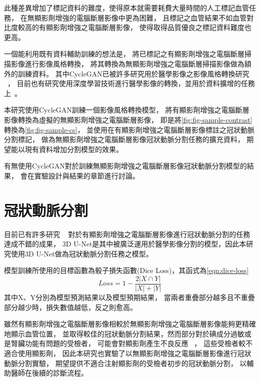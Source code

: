 \documentclass[class=NCU_thesis, crop=false]{standalone}
\begin{document}
此種差異增加了標記資料的難度，使得原本就需要耗費大量時間的人工標記血管任務，
在無顯影劑增強的電腦斷層影像中更為困難，
且標記之血管結果不如血管對比度較高的有顯影劑增強之電腦斷層影像，
使得取得品質優良之標記資料難度也更高。

一個能利用既有資料輔助訓練的想法是，
將已標記之有顯影劑增強之電腦斷層掃描影像進行影像風格轉換，
將其轉換為無顯影劑增強之電腦斷層掃描影像做為額外的訓練資料。
其中CycleGAN已被許多研究用於醫學影像之影像風格轉換研究
~\cite{jiangTumorAwareAdversarialDomain2018, welanderGenerativeAdversarialNetworks2018, songNoncontrastCTLiver2020}，
目前也有研究使用深度學習技術進行醫學影像的轉換，並用於資料擴增的任務上~\cite{songNoncontrastCTLiver2020}。

本研究使用CycleGAN訓練一個影像風格轉換模型，
將有顯影劑增強之電腦斷層影像轉換為虛擬的無顯影劑增強之電腦斷層影像，
即是將\cref{fig:fig-sample-contrast}轉換為\cref{fig:fig-sample-cs}，
並使用在有顯影劑增強之電腦斷層影像標註之冠狀動脈分割標記，
做為無顯影劑增強之電腦斷層影像冠狀動脈分割任務的擴充資料，
期望能以現有資料增加分割模型的效果。

有無使用CycleGAN對於訓練無顯影劑增強之電腦斷層影像冠狀動脈分割模型的結果，
會在實驗設計與結果的章節進行討論。

\section{冠狀動脈分割}
目前已有許多研究
~\cite{huangCoronaryArterySegmentation2018, chenCoronaryArterySegmentation2019}
對於有顯影劑增強之電腦斷層影像進行冠狀動脈分割的任務達成不錯的成果，
3D U-Net是其中被廣泛運用於醫學影像分割的模型，因此本研究使用3D U-Net做為冠狀動脈分割任務之模型。

模型訓練所使用的目標函數為骰子損失函數(Dice Loss)，其函式為\cref{eqn:dice-loss}
\begin{equation}
\label{eqn:dice-loss}
Loss = 1-\frac{2|X\cap Y|}{|X|+|Y|} 
\end{equation}
其中X、Y分別為模型預測結果以及模型預期結果，
當兩者重疊部分越多且不重疊部分越少時，損失數值越低，反之則愈高。

雖然有顯影劑增強之電腦斷層影像相較於無顯影劑增強之電腦斷層影像能夠更精確地顯示血管位置，
並取得較佳的冠狀動脈分割結果，然而部分對於碘成分過敏或是腎臟功能有問題的受檢者，
可能會對顯影劑產生不良反應
~\cite{andreucciUpdateRenalToxicity2017,rasuliMetforminContrastMedia1998,saljoughianIntravenousRadiocontrastMedia2012}，
這些受檢者較不適合使用顯影劑，
因此本研究也實驗了以無顯影劑增強之電腦斷層影像進行冠狀動脈分割實驗，
期望提供不適合注射顯影劑的受檢者初步的冠狀動脈分割，
以輔助醫師在後續的診斷流程。
\end{document}
